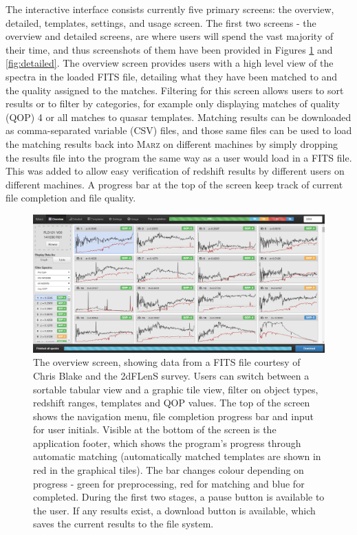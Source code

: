 \documentclass[iop]{emulateapj}
\newcommand{\marz}{\textsc{Marz}}
\begin{document}
The interactive interface consists currently five primary screens: the overview, detailed, templates, settings, and usage screen. The first two screens - the overview and detailed screens, are where users will spend the vast majority of their time, and thus screenshots of them have been provided in Figures \ref{fig:overview} and \ref{fig:detailed}. The overview screen provides users with a high level view of the spectra in the loaded FITS file, detailing what they have been matched to and the quality assigned to the matches. Filtering for this screen allows users to sort results or to filter by categories, for example only displaying matches of quality (QOP) 4 or all matches to quasar templates. Matching results can be downloaded as comma-separated variable (CSV) files, and those same files can be used to load the matching results back into \marz{} on different machines by simply dropping the results file into the program the same way as a user would load in a FITS file. This was added to allow easy verification of redshift results by different users on different machines. A progress bar at the top of the screen keep track of current file completion and file quality.\\



\begin{figure}[H]
\centering
\includegraphics[width=\textwidth]{InterfaceZ.png}
\caption{The overview screen, showing data from a FITS file courtesy of Chris Blake and the 2dFLenS survey. Users can switch between a sortable tabular view and a graphic tile view, filter on object types, redshift ranges, templates and QOP values. The top of the screen shows the navigation menu, file completion progress bar and input for user initials. Visible at the bottom of the screen is the application footer, which shows the program's progress through automatic matching (automatically matched templates are shown in red in the graphical tiles). The bar changes colour depending on progress - green for preprocessing, red for matching and blue for completed. During the first two stages, a pause button is available to the user. If any results exist, a download button is available, which saves the current results to the file system.}
\label{fig:overview}
\end{figure}
\end{document}
